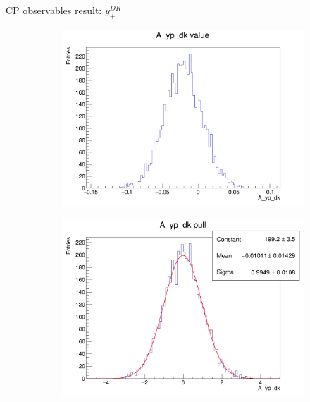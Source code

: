 \documentclass{beamer}
\begin{document}
\begin{frame}{CP observables result: $y_+^{DK}$}
  \begin{figure}
    \centering
    \begin{subfigure}{0.42\textwidth}
      \includegraphics[width = 1.0\textwidth]{Plots/A_yp_dk_value.png}
    \end{subfigure}
    \begin{subfigure}{0.42\textwidth}
      \includegraphics[width = 1.0\textwidth]{Plots/A_yp_dk_pull.png}
    \end{subfigure}%
    \begin{subfigure}{0.42\textwidth}

\end{subfigure}
\end{figure}
\end{frame}
\end{document}
